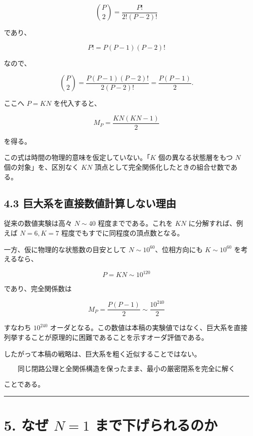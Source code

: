 \documentclass[
  a4paper,
]{ltjsarticle}
\begin{document}
\[
\binom{P}{2}
=
\frac{P!}{2!(P-2)!}
\]

であり、

\[
P!
=
P(P-1)(P-2)!
\]

なので、

\[
\binom{P}{2}
=
\frac{P(P-1)(P-2)!}{2(P-2)!}
=
\frac{P(P-1)}{2}.
\]

ここへ \(P=KN\) を代入すると、

\[
\boxed{
M_P
=
\frac{KN(KN-1)}{2}
}
\]

を得る。

この式は時間の物理的意味を仮定していない。「\(K\) 個の異なる状態層をもつ
\(N\) 個の対象」を、区別なく \(KN\)
頂点として完全関係化したときの組合せ数である。

\subsection{4.3
巨大系を直接数値計算しない理由}\label{ux5de8ux5927ux7cfbux3092ux76f4ux63a5ux6570ux5024ux8a08ux7b97ux3057ux306aux3044ux7406ux7531}

従来の数値実験は高々 \(N\sim40\) 程度までである。これを \(KN\)
に分解すれば、例えば \(N=6, K=7\) 程度でもすでに同程度の頂点数となる。

一方、仮に物理的な状態数の目安として \(N\sim10^{60}\)、位相方向にも
\(K\sim10^{60}\) を考えるなら、

\[
P=KN\sim10^{120}
\]

であり、完全関係数は

\[
M_P
=
\frac{P(P-1)}{2}
\sim
\frac{10^{240}}{2}
\]

すなわち \(10^{240}\)
オーダとなる。この数値は本稿の実験値ではなく、巨大系を直接列挙することが原理的に困難であることを示すオーダ評価である。

したがって本稿の戦略は、巨大系を粗く近似することではない。

\[
\boxed{
\text{同じ閉路公理と全関係構造を保ったまま、最小の厳密閉系を完全に解く}
}
\]

ことである。

\begin{center}\rule{0.5\linewidth}{0.5pt}\end{center}

\section{\texorpdfstring{5. なぜ \(N=1\)
まで下げられるのか}{5. なぜ N=1 まで下げられるのか}}\label{ux306aux305c-n1-ux307eux3067ux4e0bux3052ux3089ux308cux308bux306eux304b}
\end{document}
